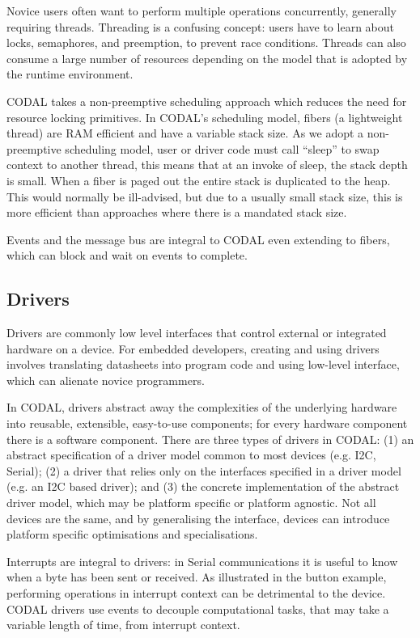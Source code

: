 Novice users often want to perform multiple operations concurrently, generally requiring threads. Threading is a confusing concept: users have to learn about locks, semaphores, and preemption, to prevent race conditions. Threads can also consume a large number of resources depending on the model that is adopted by the runtime environment.

CODAL takes a non-preemptive scheduling approach which reduces the need for resource locking primitives. In CODAL's scheduling model, fibers (a lightweight thread) are RAM efficient and have a variable stack size. As we adopt a non-preemptive scheduling model, user or driver code must call ``sleep'' to swap context to another thread, this means that at an invoke of sleep, the stack depth is small. When a fiber is paged out the entire stack is duplicated to the heap. This would normally be ill-advised, but due to a usually small stack size, this is more efficient than approaches where there is a mandated stack size.

Events and the message bus are integral to CODAL even extending to fibers, which can block and wait on events to complete.

\subsection{Drivers}

Drivers are commonly low level interfaces that control external or integrated hardware on a device. For embedded developers, creating and using drivers involves translating datasheets into program code and using low-level interface, which can alienate novice programmers.

In CODAL, drivers abstract away the complexities of the underlying hardware into reusable, extensible, easy-to-use components; for every hardware component there is a software component. There are three types of drivers in CODAL: (1) an abstract specification of a driver model common to most devices (e.g. I2C, Serial); (2) a driver that relies only on the interfaces specified in a driver model  (e.g. an I2C based driver); and (3) the concrete implementation of the abstract driver model, which may be platform specific or platform agnostic. Not all devices are the same, and by generalising the interface, devices can introduce platform specific optimisations and specialisations.

Interrupts are integral to drivers: in Serial communications it is useful to know when a byte has been sent or received. As illustrated in the button example, performing operations in interrupt context can be detrimental to the device. CODAL drivers use events to decouple computational tasks, that may take a variable length of time, from interrupt context.

